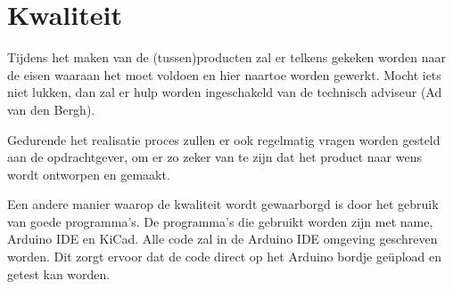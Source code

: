 \section{Kwaliteit}
Tijdens het maken van de (tussen)producten zal er telkens gekeken worden naar de eisen waaraan het moet voldoen en hier naartoe worden gewerkt. Mocht iets niet lukken, dan zal er hulp worden ingeschakeld van de technisch adviseur (Ad van den Bergh).

Gedurende het realisatie proces zullen er ook regelmatig vragen worden gesteld aan de opdrachtgever, om er zo zeker van te zijn dat het product naar wens wordt ontworpen en gemaakt.

Een andere manier waarop de kwaliteit wordt gewaarborgd is door het gebruik van goede programma’s. De programma’s die gebruikt worden zijn met name, Arduino IDE en KiCad. Alle code zal in de Arduino IDE omgeving geschreven worden. Dit zorgt ervoor dat de code direct op het Arduino bordje geüpload en getest kan worden.
